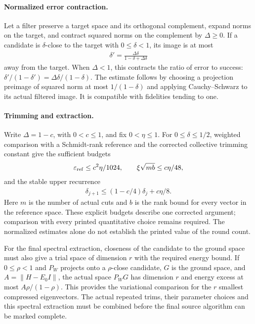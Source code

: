 \documentclass{article}
\begin{document}
\paragraph{Normalized error contraction.}
Let a filter preserve a target space and its orthogonal complement,
expand norms on the target, and contract squared norms on the complement
by $\Delta\ge0$.
If a candidate is $\delta$-close to the target with $0\le\delta<1$, its
image is at most
\begin{align}
 \delta' = \frac{\Delta\delta}{1-\delta+\Delta\delta}
    \label{eq:alvv16_ffg_contracted_error}
\end{align}
away from the target. When $\Delta<1$, this contracts the ratio of error
to success: $\delta'/(1-\delta')=\Delta\delta/(1-\delta)$.
The estimate follows by choosing a projection preimage of squared norm
at most $1/(1-\delta)$ and applying Cauchy--Schwarz to its actual filtered
image. It is compatible with fidelities tending to one.

\paragraph{Trimming and extraction.}
Write $\Delta=1-c$, with $0<c\le1$, and fix $0<\eta\le1$.
For $0\le\delta\le1/2$, weighted
comparison with a Schmidt-rank reference and the corrected collective
trimming constant give the sufficient budgets
\begin{align}
 \varepsilon_{\rm ref}\le c^2\eta/1024,\qquad
 \xi\sqrt{mb}\le c\eta/48,
    \label{eq:alvv16_ffg_trim_budgets}
\end{align}
and the stable upper recurrence
\begin{align}
 \delta_{j+1}\le(1-c/4)\delta_j+c\eta/8.
    \label{eq:alvv16_ffg_error_recurrence}
\end{align}
Here $m$ is the number of actual cuts and $b$ is the rank bound for every
vector in the reference space. These explicit budgets describe one
corrected argument; comparison with every printed quantitative choice
remains required. The normalized estimates alone do not establish the
printed value of the round count.

For the final spectral extraction, closeness of the candidate to the
ground space must also give a trial space of dimension $r$ with the
required energy bound. If $0\le\rho<1$ and $P_W$ projects onto a $\rho$-close candidate,
$G$ is the ground space, and $A=\lVert H-E_0I\rVert$, the actual space
$P_WG$ has dimension $r$ and energy excess at most $A\rho/(1-\rho)$.
This provides the variational comparison for the $r$ smallest compressed
eigenvectors. The actual repeated trims, their parameter choices and
this spectral extraction must be combined before the final source
algorithm can be marked complete.
\end{document}
